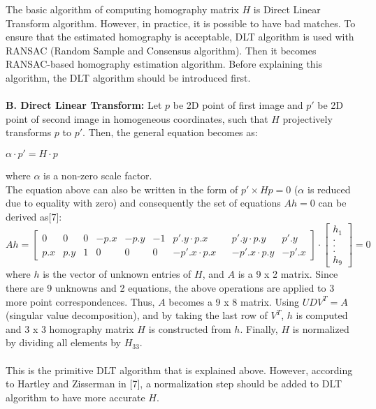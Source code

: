 \documentclass{article}
\begin{document}
The basic algorithm of computing homography matrix $H$ is Direct Linear Transform algorithm. However, in practice, it is possible to have bad matches. To ensure that the estimated homography is acceptable, DLT algorithm is used with RANSAC (Random Sample and Consensus algorithm). Then it becomes RANSAC-based homography estimation algorithm. Before explaining this algorithm, the DLT algorithm should be introduced first.\\~\\
\textbf{B. Direct Linear Transform:} Let $p$ be 2D point of first image and $p'$ be 2D point of second image in homogeneous coordinates, such that $H$ projectively transforms $p$ to $p'$. Then, the general equation becomes as:
\begin{center}
	$ \alpha \cdot p' = H\cdot p$
\end{center}
where $\alpha$ is a non-zero scale factor.\\
The equation above can also be written in the form of $p' \times Hp = 0$ ($\alpha$ is reduced due to equality with zero) and consequently the set of equations $Ah = 0$ can be derived as[7]: 
\begin{equation*}
    Ah = \begin{bmatrix}
			0 & 0 & 0 &-p.x &-p.y &-1 &p'.y \cdot p.x & &p'.y \cdot p.y &p'.y\\
			p.x & p.y & 1 &0 &0 &0 &-p'.x \cdot p.x & &-p'.x \cdot p.y &-p'.x
			\end{bmatrix} \cdot \begin{bmatrix}
			h_{1}\\
			.\\
			.\\
			.\\
			h_{9}
			\end{bmatrix} = 0 
\end{equation*}
where  $h$ is the vector of unknown entries of $H$, and $A$ is a 9 x 2 matrix. Since there are 9 unknowns and 2 equations, the above operations are applied to 3 more point correspondences. Thus, $A$ becomes  a 9 x 8 matrix. Using $UDV^{T} = A$ (singular value decomposition), and by taking the last row of $V^{T}$, $h$ is computed and 3 x 3 homography matrix $H$ is constructed from $h$. Finally, $H$ is normalized by dividing all elements by $H_{33}$.\\~\\
This is the primitive DLT algorithm that is explained above. However, according to Hartley and Zisserman in [7], a normalization step should be added to DLT algorithm to have more accurate $H$.
\end{document}
